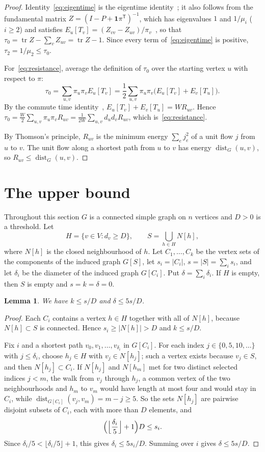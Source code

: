 \documentclass[11pt]{amsart}
\newtheorem{lemma}[theorem]{Lemma}
\theoremstyle{definition}
\theoremstyle{remark}
\numberwithin{equation}{section}
\DeclareMathOperator{\dist}{dist}
\DeclareMathOperator{\tr}{tr}
\begin{document}
\begin{proof}
Identity~\eqref{eq:eigentime} is the eigentime identity~\cite[Chapter~3]{AF}; it also follows from the fundamental matrix $Z=(I-P+\mathbf 1\pi^{\mathsf T})^{-1}$, which has eigenvalues $1$ and $1/\mu_i$ ($i\ge2$) and satisfies $E_u[T_v]=(Z_{vv}-Z_{uv})/\pi_v$~\cite{KS}, so that $\tau_0=\tr Z-\sum_vZ_{uv}=\tr Z-1$. Since every term of~\eqref{eq:eigentime} is positive, $\tau_2=1/\mu_2\le\tau_0$.

For~\eqref{eq:resistance}, average the definition of $\tau_0$ over the starting vertex $u$ with respect to $\pi$:
\[
\tau_0=\sum_{u,v}\pi_u\pi_vE_u[T_v]=\frac12\sum_{u,v}\pi_u\pi_v\bigl(E_u[T_v]+E_v[T_u]\bigr).
\]
By the commute time identity~\cite{CRRST}, $E_u[T_v]+E_v[T_u]=WR_{uv}$. Hence $\tau_0=\frac W2\sum_{u,v}\pi_u\pi_vR_{uv}=\frac1{2W}\sum_{u,v}d_ud_vR_{uv}$, which is~\eqref{eq:resistance}.

By Thomson's principle, $R_{uv}$ is the minimum energy $\sum_{e}j_e^2$ of a unit flow $j$ from $u$ to $v$. The unit flow along a shortest path from $u$ to $v$ has energy $\dist_G(u,v)$, so $R_{uv}\le\dist_G(u,v)$.
\end{proof}

\section{The upper bound}\label{sec:upper}

Throughout this section $G$ is a connected simple graph on $n$ vertices and $D>0$ is a threshold. Let
\[
H=\{v\in V:d_v\ge D\},\qquad S=\bigcup_{h\in H}N[h],
\]
where $N[h]$ is the closed neighbourhood of $h$. Let $C_1,\dots,C_k$ be the vertex sets of the components of the induced graph $G[S]$, let $s_i=|C_i|$, $s=|S|=\sum_is_i$, and let $\delta_i$ be the diameter of the induced graph $G[C_i]$. Put $\delta=\sum_i\delta_i$. If $H$ is empty, then $S$ is empty and $s=k=\delta=0$.

\begin{lemma}\label{lem:components}
We have $k\le s/D$ and $\delta\le5s/D$.
\end{lemma}

\begin{proof}
Each $C_i$ contains a vertex $h\in H$ together with all of $N[h]$, because $N[h]\subset S$ is connected. Hence $s_i\ge|N[h]|>D$ and $k\le s/D$.

Fix $i$ and a shortest path $v_0,v_1,\dots,v_{\delta_i}$ in $G[C_i]$. For each index $j\in\{0,5,10,\dots\}$ with $j\le\delta_i$, choose $h_j\in H$ with $v_j\in N[h_j]$; such a vertex exists because $v_j\in S$, and then $N[h_j]\subset C_i$. If $N[h_j]$ and $N[h_m]$ met for two distinct selected indices $j<m$, the walk from $v_j$ through $h_j$, a common vertex of the two neighbourhoods and $h_m$ to $v_m$ would have length at most four and would stay in $C_i$, while $\dist_{G[C_i]}(v_j,v_m)=m-j\ge5$. So the sets $N[h_j]$ are pairwise disjoint subsets of $C_i$, each with more than $D$ elements, and
\[
\Bigl(\Bigl\lfloor\frac{\delta_i}5\Bigr\rfloor+1\Bigr)D\le s_i .
\]
Since $\delta_i/5<\lfloor\delta_i/5\rfloor+1$, this gives $\delta_i\le5s_i/D$. Summing over $i$ gives $\delta\le5s/D$.
\end{proof}
\end{document}
